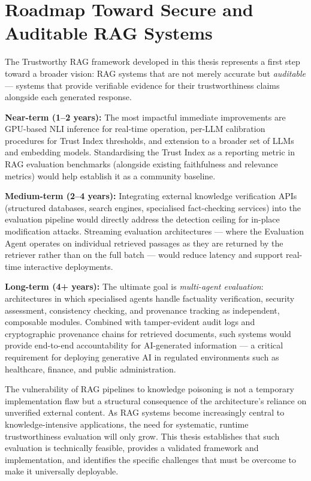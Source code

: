 \section{Roadmap Toward Secure and Auditable RAG Systems}
\label{sec:conc_roadmap}

The Trustworthy RAG framework developed in this thesis represents a first step toward a broader vision: RAG systems that are not merely accurate but \textit{auditable} --- systems that provide verifiable evidence for their trustworthiness claims alongside each generated response.

\textbf{Near-term (1--2 years):} The most impactful immediate improvements are GPU-based NLI inference for real-time operation, per-LLM calibration procedures for Trust Index thresholds, and extension to a broader set of LLMs and embedding models. Standardising the Trust Index as a reporting metric in RAG evaluation benchmarks (alongside existing faithfulness and relevance metrics) would help establish it as a community baseline.

\textbf{Medium-term (2--4 years):} Integrating external knowledge verification APIs (structured databases, search engines, specialised fact-checking services) into the evaluation pipeline would directly address the detection ceiling for in-place modification attacks. Streaming evaluation architectures --- where the Evaluation Agent operates on individual retrieved passages as they are returned by the retriever rather than on the full batch --- would reduce latency and support real-time interactive deployments.

\textbf{Long-term (4+ years):} The ultimate goal is \textit{multi-agent evaluation}: architectures in which specialised agents handle factuality verification, security assessment, consistency checking, and provenance tracking as independent, composable modules. Combined with tamper-evident audit logs and cryptographic provenance chains for retrieved documents, such systems would provide end-to-end accountability for AI-generated information --- a critical requirement for deploying generative AI in regulated environments such as healthcare, finance, and public administration.

The vulnerability of RAG pipelines to knowledge poisoning is not a temporary implementation flaw but a structural consequence of the architecture's reliance on unverified external content. As RAG systems become increasingly central to knowledge-intensive applications, the need for systematic, runtime trustworthiness evaluation will only grow. This thesis establishes that such evaluation is technically feasible, provides a validated framework and implementation, and identifies the specific challenges that must be overcome to make it universally deployable.

